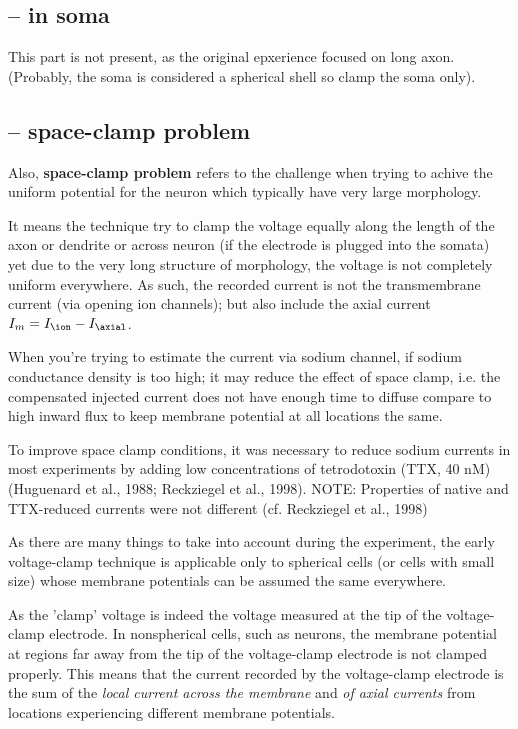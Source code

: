 \subsection{-- in soma}
\label{sec:space-clamp-soma}

This part is not present, as the original epxerience focused on long
axon. (Probably, the soma is considered a spherical shell so clamp the soma
only).

\subsection{-- space-clamp problem}
\label{sec:space-clamp-problem}

Also, {\bf space-clamp problem} refers to the challenge when
trying to achive the uniform potential for the neuron which typically have
very large morphology.

It means the technique try to clamp the voltage equally along the length of the
axon or dendrite or across neuron (if the electrode is plugged into the somata)
yet due to the very long structure of morphology, the voltage is not completely
uniform everywhere. As such, the recorded current is not the transmembrane
current (via opening ion channels); but also include the axial current
$I_m=I_\ion - I_\axial$.

When you're trying to estimate the current via sodium channel, if sodium
conductance density is too high; it may reduce the effect of space clamp, i.e.
the compensated injected current does not have enough time to diffuse compare to
high inward flux to keep membrane potential at all locations the same.

To improve space clamp conditions, it was necessary to reduce sodium currents in
most experiments by adding low concentrations of tetrodotoxin (TTX, 40 nM)
(Huguenard et al., 1988; Reckziegel et al., 1998). NOTE: Properties of native
and TTX-reduced currents were not different (cf. Reckziegel et al., 1998)

As there are many things to take into account during the experiment, the early
voltage-clamp technique is applicable only to spherical cells (or cells with
small size) whose membrane potentials can be assumed the same everywhere.

As the 'clamp' voltage is indeed the voltage measured at the tip of the
voltage-clamp electrode. In nonspherical cells, such as neurons, the membrane
potential at regions far away from the tip of the voltage-clamp electrode is not
clamped properly. This means that the current recorded by the voltage-clamp
electrode is the sum of the {\it local current across the membrane} and {\it of
axial currents} from locations experiencing different membrane potentials.


